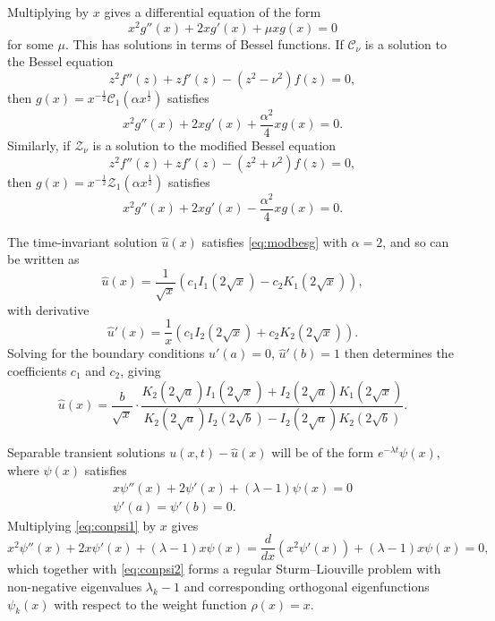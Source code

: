 \documentclass[parskip=half]{scrartcl}
\newcommand{\cZ}{\mathcal{Z}}
\newcommand{\cC}{\mathcal{C}}
\theoremstyle{nonumberplain}
\begin{document}
Multiplying by $x$ gives a differential equation of the form
\begin{equation}
    \label{eq:conicmu}
    x^2 g''(x) + 2x g'(x) + \mu x g(x) = 0
\end{equation}
for some $\mu$. This has solutions in terms of Bessel functions.
If $\cC_\nu$ is a solution to the Bessel equation
\begin{equation}
    z^2 f''(z) + z f'(z) - (z^2 - \nu^2) f(z) = 0,
\end{equation}
then $g(x) = x^{-\frac{1}{2}}\cC_1(\alpha x^\frac{1}{2})$ satisfies
\begin{equation}
    \label{eq:besg}
    x^2 g''(x) + 2x g'(x) + \frac{\alpha^2}{4} x g(x) = 0.
\end{equation}
Similarly, if $\cZ_\nu$ is a solution to the modified Bessel equation
\begin{equation}
    z^2 f''(z) + z f'(z) - (z^2 + \nu^2) f(z) = 0,
\end{equation}
then $g(x) = x^{-\frac{1}{2}}\cZ_1(\alpha x^\frac{1}{2})$ satisfies
\begin{equation}
    \label{eq:modbesg}
    x^2 g''(x) + 2x g'(x) - \frac{\alpha^2}{4} x g(x) = 0.
\end{equation}

The time-invariant solution $\hat u(x)$ satisfies \eqref{eq:modbesg} with $\alpha=2$, and so
can be written as
\begin{equation}
    \hat u(x) = \frac{1}{\sqrt{x}} \left(c_1 I_1(2\sqrt{x}) - c_2 K_1(2\sqrt{x})\right),
\end{equation}
with derivative
\begin{equation}
    \hat u'(x) = \frac{1}{x} \left(c_1 I_2(2\sqrt{x}) + c_2 K_2(2\sqrt{x})\right).
\end{equation}
Solving for the boundary conditions $\hat u'(a)=0$, $\hat u'(b)=1$ then determines the coefficients
$c_1$ and $c_2$, giving
\begin{equation}
    \label{eq:conuhat}
    \hat u(x) =
    \frac{b}{\sqrt{x}}\cdot
    \frac{K_2(2\sqrt{a})I_1(2\sqrt{x}) + I_2(2\sqrt{a})K_1(2\sqrt{x})}
    {K_2(2\sqrt{a})I_2(2\sqrt{b})-I_2(2\sqrt{a})K_2(2\sqrt{b})}.
\end{equation}

Separable transient solutions $u(x,t)-\hat u(x)$ will be of the form $e^{-\lambda t}\psi(x)$,
where $\psi(x)$ satisfies
\begin{gather}
    \label{eq:conpsi1}
    x\psi''(x) + 2\psi'(x) + (\lambda-1)\psi(x) = 0\\
    \label{eq:conpsi2}
    \psi'(a) = \psi'(b) = 0.
\end{gather}
Multiplying \eqref{eq:conpsi1} by $x$ gives
\begin{equation}
    \label{eq:conpsils}
    x^2\psi''(x) + 2x\psi'(x) + (\lambda-1)x \psi(x) =
    \frac{d}{dx}(x^2\psi'(x)) + (\lambda-1)x \psi(x) = 0,
\end{equation}
which together with \eqref{eq:conpsi2} forms a regular Sturm--Liouville problem with
non-negative eigenvalues $\lambda_k-1$ and corresponding orthogonal eigenfunctions
$\psi_k(x)$ with respect to the weight function $\rho(x) = x$.
\end{document}

